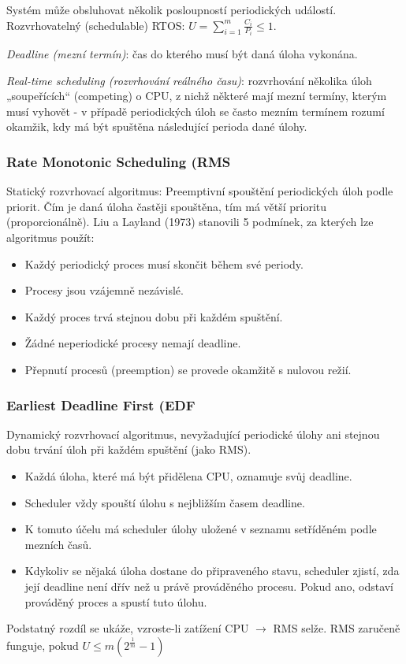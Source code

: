 Systém může obsluhovat několik posloupností periodických událostí. Rozvrhovatelný (schedulable) RTOS: $ U = \displaystyle{\sum_{i=1}^m} \frac{C_i}{P_i} \leq 1 $.

\textit{Deadline (mezní termín)}: čas do kterého musí být daná úloha vykonána.

\textit{Real-time scheduling (rozvrhování reálného času)}: rozvrhování několika úloh „soupeřících“ (competing) o CPU, z nichž některé mají mezní termíny, kterým musí vyhovět - v případě periodických úloh se často mezním termínem rozumí okamžik, kdy má být spuštěna následující perioda dané úlohy.

\subsubsection*{Rate Monotonic Scheduling (RMS}
Statický rozvrhovací algoritmus: Preemptivní spouštění periodických úloh podle priorit. Čím je daná úloha častěji spouštěna, tím má větší prioritu (proporcionálně). Liu a Layland (1973) stanovili 5 podmínek, za kterých lze algoritmus použít:
\begin{itemize}
\item Každý periodický proces musí skončit během své periody.
\item Procesy jsou vzájemně nezávislé.
\item Každý proces trvá stejnou dobu při každém spuštění.
\item Žádné neperiodické procesy nemají deadline.
\item Přepnutí procesů (preemption) se provede okamžitě s nulovou režií.
\end{itemize}

\subsubsection*{Earliest Deadline First (EDF}
Dynamický rozvrhovací algoritmus, nevyžadující periodické úlohy ani stejnou dobu trvání úloh při každém spuštění (jako RMS).
\begin{itemize}
\item Každá úloha, které má být přidělena CPU, oznamuje svůj deadline.
\item Scheduler vždy spouští úlohu s nejbližším časem deadline.
\item K tomuto účelu má scheduler úlohy uložené v seznamu setříděném podle mezních časů.
\item Kdykoliv se nějaká úloha dostane do připraveného stavu, scheduler zjistí, zda její deadline není dřív než u právě prováděného procesu. Pokud ano, odstaví prováděný proces a spustí tuto úlohu.
\end{itemize}
Podstatný rozdíl se ukáže, vzroste-li zatížení CPU $ \to $ RMS selže. RMS zaručeně funguje, pokud $ U \leq m(2^{\frac{1}{m}}-1) $

